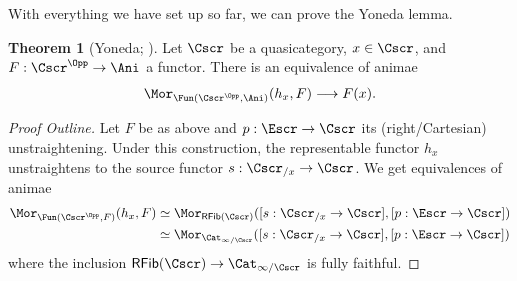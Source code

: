 \documentclass{amsart}
\theoremstyle{definition}
\newtheorem{theorem}{Theorem}[section]
\numberwithin{equation}{section}
\begin{document}
With everything we have set up so far, we can prove the Yoneda lemma.
\begin{theorem}[Yoneda; {\cite[Thm. 5.19]{Wagner}}]\label{thm: Yoneda}
  Let $\Cscr$ be a quasicategory, $x\in\Cscr$, and $F:\Cscr^{\Opp}\to\Ani$ a functor. There is an equivalence of animae
  $$\Mor_{\Fun(\Cscr^{\Opp},\Ani)}(h_{x},F)\longrightarrow F(x).$$
\end{theorem}
\begin{proof}[Proof Outline]
  Let $F$ be as above and $p:\Escr\to\Cscr$ its (right/Cartesian) unstraightening. Under this construction, the representable functor $h_{x}$ unstraightens to the source functor $s:\Cscr_{/x}\to\Cscr$. We get equivalences of animae
  \begin{align*}
    \Mor_{\Fun(\Cscr^{\Opp},F)}(h_{x},F) &\simeq \Mor_{\mathsf{RFib}(\Cscr)}([s:\Cscr_{/x}\to\Cscr],[p:\Escr\to\Cscr]) \\
    &\simeq \Mor_{\Cat_{\infty/\Cscr}}([s:\Cscr_{/x}\to\Cscr],[p:\Escr\to\Cscr])
  \end{align*}
  where the inclusion $\mathsf{RFib}(\Cscr)\to\Cat_{\infty/\Cscr}$ is fully faithful.


\end{proof}
\end{document}
